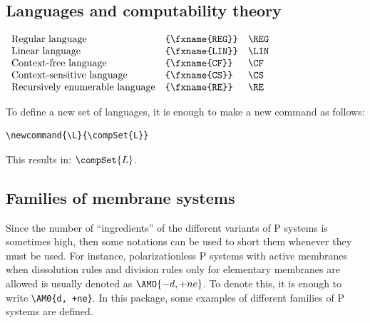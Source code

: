 \documentclass{article}
\begin{document}
\subsection{Languages and computability theory}
\label{sec:lang-comp-theory}

$
\begin{array}{lll}
  \mbox{Regular language} & \verb=\REG= & \REG \\
  \mbox{Linear language} & \verb=\LIN= & \LIN \\
  \mbox{Context-free language} & \verb=\CF= & \CF \\
  \mbox{Context-sensitive language} & \verb=\CS= & \CS \\
  \mbox{Recursively enumerable language} & \verb=\RE= & \RE \\
\end{array}
$

To define a new set of languages, it is enough to make a new command
as follows:

\begin{verbatim}
\newcommand{\L}{\compSet{L}}
\end{verbatim}

This results in: $\compSet{L}$.

\subsection{Families of membrane systems}
\label{sec:famil-membr-syst}

Since the number of ``ingredients'' of the different variants of P
systems is sometimes high, then some notations can be used to short
them whenever they must be used. For instance, polarizationless P
systems with active membranes when dissolution rules and division
rules only for elementary membranes are allowed is usually denoted as
$\AMO{-d, +ne}$. To denote this, it is enough to write
\verb=\AM0{d, +ne}=. In this package, some examples of different
families of P systems are defined.
\end{document}
